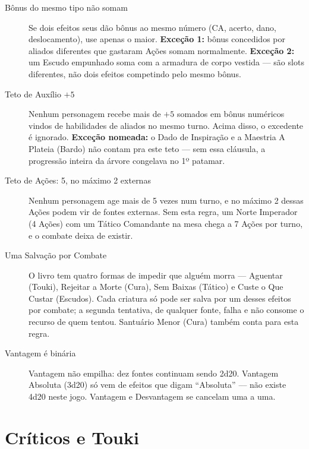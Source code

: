 \begin{description}
    \item[Bônus do mesmo tipo não somam] Se dois efeitos seus dão bônus ao mesmo número (CA,
          acerto, dano, deslocamento), use apenas o maior. \textbf{Exceção 1:} bônus
          concedidos por aliados diferentes que gastaram Ações somam normalmente.
          \textbf{Exceção 2:} um Escudo empunhado soma com a armadura de corpo vestida ---
          são slots diferentes, não dois efeitos competindo pelo mesmo bônus.

    \item[Teto de Auxílio $+5$] Nenhum personagem recebe mais de $+5$ somados em bônus
          numéricos vindos de habilidades de aliados no mesmo turno. Acima disso, o excedente
          é ignorado. \textbf{Exceção nomeada:} o Dado de Inspiração e a Maestria A Plateia
          (Bardo) não contam pra este teto --- sem essa cláusula, a progressão inteira da
          árvore congelava no 1º patamar.

    \item[Teto de Ações: 5, no máximo 2 externas] Nenhum personagem age mais de 5 vezes num
          turno, e no máximo 2 dessas Ações podem vir de fontes externas. Sem esta regra, um
          Norte Imperador (4 Ações) com um Tático Comandante na mesa chega a 7 Ações por
          turno, e o combate deixa de existir.

    \item[Uma Salvação por Combate] O livro tem quatro formas de impedir que alguém morra ---
          Aguentar (Touki), Rejeitar a Morte (Cura), Sem Baixas (Tático) e Custe o Que
          Custar (Escudos). Cada criatura só pode ser salva por um desses efeitos por
          combate; a segunda tentativa, de qualquer fonte, falha e não consome o recurso de
          quem tentou. Santuário Menor (Cura) também conta para esta regra.

    \item[Vantagem é binária] Vantagem não empilha: dez fontes continuam sendo 2d20. Vantagem
          Absoluta (3d20) só vem de efeitos que digam \enquote{Absoluta} --- não existe 4d20
          neste jogo. Vantagem e Desvantagem se cancelam uma a uma.
\end{description}

\section{Críticos e Touki}

